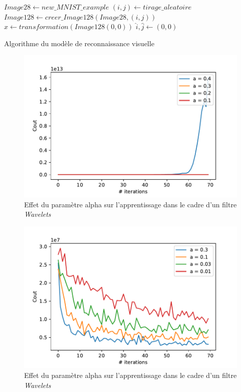 \begin{algorithm}
\SetAlgoLined
$Image28 \leftarrow new\_MNIST\_example$\;
$(i,j) \leftarrow tirage\_aleatoire$\;
$Image128 \leftarrow creer\_Image128(Image28,(i,j))$\;
$x \leftarrow transformation(Image128(0,0))$\;
$\hat{i},\hat{j} \leftarrow (0,0)$\;
\caption{Algorithme du modèle de reconnaissance visuelle\label{Algo}}
\end{algorithm}


\begin{figure}[th]
\centering
\includegraphics{Figures/Benchmarking_para_alpha_3}
\decoRule %
\caption[Figure]{Effet du paramètre alpha sur l'apprentissage dans le cadre d'un filtre \textit{Wavelets}}
\label{fig:benchmark_surApp2}
\end{figure}

\begin{figure}[th]
\centering
\includegraphics{Figures/Benchmarking_para_alpha}
\decoRule
\caption[Figure]{Effet du paramètre alpha sur l'apprentissage dans le cadre d'un filtre \textit{Wavelets}}
\label{fig:benchmark_alpha}
\end{figure}

